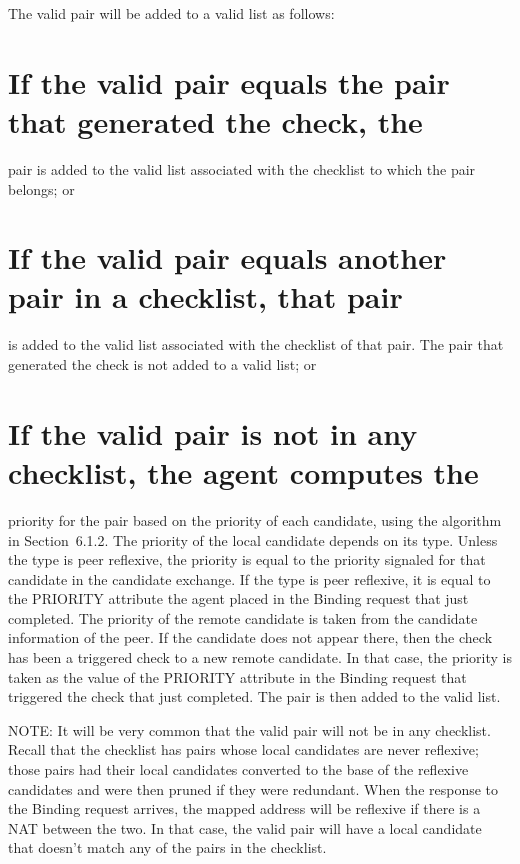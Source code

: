 \documentclass{article}
\begin{document}
The valid pair will be added to a valid list as follows:

\section{If the valid pair equals the pair that generated the check, the}

pair is added to the valid list associated with the checklist to which the pair belongs; or

\section{If the valid pair equals another pair in a checklist, that pair}

is added to the valid list associated with the checklist of that pair.  The pair that generated the check is not added to a valid list; or

\section{If the valid pair is not in any checklist, the agent computes the}

priority for the pair based on the priority of each candidate, using the algorithm in Section~6.1.2.  The priority of the local candidate depends on its type.  Unless the type is peer reflexive, the priority is equal to the priority signaled for that candidate in the candidate exchange.  If the type is peer reflexive, it is equal to the PRIORITY attribute the agent placed in the Binding request that just completed.  The priority of the remote candidate is taken from the candidate information of the peer.  If the candidate does not appear there, then the check has been a triggered check to a new remote candidate.  In that case, the priority is taken as the value of the PRIORITY attribute in the Binding request that triggered the check that just completed. The pair is then added to the valid list.

NOTE: It will be very common that the valid pair will not be in any checklist.  Recall that the checklist has pairs whose local candidates are never reflexive; those pairs had their local candidates converted to the base of the reflexive candidates and were then pruned if they were redundant.  When the response to the Binding request arrives, the mapped address will be reflexive if there is a NAT between the two.  In that case, the valid pair will have a local candidate that doesn't match any of the pairs in the checklist.
\end{document}
